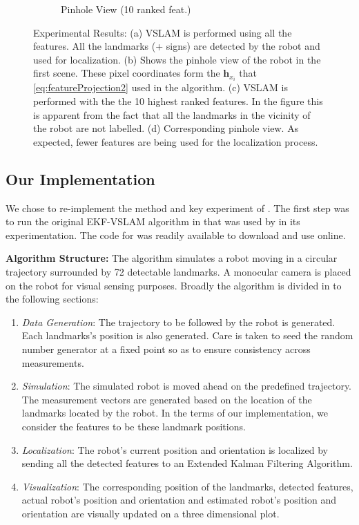 \documentclass[10pt,twocolumn,letterpaper]{article}
\begin{document}
\begin{figure}[t!]
\begin{subfigure}[b]{0.25\textwidth}
                \caption{Pinhole View (10 ranked feat.)}
                \label{fig:mouse}
        \end{subfigure}
        \caption{Experimental Results: (a) VSLAM is performed using all the features. All the landmarks (+ signs) are detected by the robot and used for localization. (b) Shows the pinhole view of the robot in the first scene. These pixel coordinates form the $\boldsymbol{h}_{x_i}$ that \eqref{eq:featureProjection2} used in the algorithm. (c) VSLAM is performed with the the 10 highest ranked features. In the figure this is apparent from the fact that all the landmarks in the vicinity of the robot are not labelled. (d) Corresponding pinhole view. As expected, fewer features are being used for the localization process.}
\label{fig:animals}
\end{figure}

\subsection{Our Implementation}
We chose to re-implement the method and key experiment of \cite{Zhang_2015_CVPR}. The first step was to run the original EKF-VSLAM algorithm in \cite{31} that was used by \cite{Zhang_2015_CVPR} in its experimentation. The code for \cite{31} was readily available to download and use online.

\textbf{Algorithm Structure:} The algorithm simulates a robot moving in a circular trajectory surrounded by 72 detectable landmarks. A monocular camera is placed on the robot for visual sensing purposes. Broadly the algorithm is divided in to the following sections:
\begin{enumerate}
  \item \textit{Data Generation}: The trajectory to be followed by the robot is generated. Each landmarks's position is also generated. Care is taken to seed the random number generator at a fixed point so as to ensure consistency across measurements.
  \item \textit{Simulation}: The simulated robot is moved ahead on the predefined trajectory. The measurement vectors are generated based on the location of the landmarks located by the robot. In the terms of our implementation, we consider the features to be these landmark positions. 
 \item \textit{Localization}: The robot's current position and orientation is localized by sending all the detected features to an Extended Kalman Filtering Algorithm.
\item \textit{Visualization}: The corresponding position of the landmarks, detected features, actual robot's position and orientation and estimated robot's position and orientation are visually updated on a three dimensional plot.
\end{enumerate}
\end{document}

